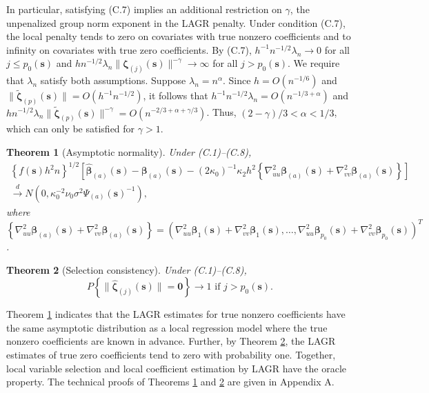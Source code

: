 \documentclass[authoryear,review, 12pt]{elsarticle}
\newtheorem{thm}{Theorem}
\begin{document}
In particular, satisfying (C.7) implies an additional restriction
on $\gamma$, the unpenalized group norm exponent in the LAGR penalty.
Under condition (C.7), the local penalty tends to zero on covariates
with true nonzero coefficients and to infinity on covariates with
true zero coefficients. By (C.7), $h^{-1}n^{-1/2}\lambda_{n}\to0$
for all $j\le p_{0}(\bm{s})$ and $hn^{-1/2}\lambda_{n}\|\bm{\zeta}_{(j)}(\bm{s})\|^{-\gamma}\to\infty$
for all $j>p_{0}(\bm{s})$. We require that $\lambda_{n}$ satisfy both assumptions.
Suppose $\lambda_{n}=n^{\alpha}$. Since $h=O\left(n^{-1/6}\right)$
and $\|\tilde{\bm{\zeta}}_{(p)}(\bm{s})\|=O\left(h^{-1}n^{-1/2}\right)$,
it follows that $h^{-1}n^{-1/2}\lambda_{n}=O\left(n^{-1/3+\alpha}\right)$
and $hn^{-1/2}\lambda_{n}\|\tilde{\bm{\zeta}}_{(p)}(\bm{s})\|^{-\gamma}=O\left(n^{-2/3+\alpha+\gamma/3}\right)$.
Thus, $\left(2-\gamma\right)/3<\alpha<1/3$, which can only be satisfied
for $\gamma>1$.
\begin{thm}[Asymptotic normality]
\label{theorem:normality}  Under (C.1)--(C.8),
\begin{gather*}
\left\{ f(\bm{s})h^{2}n\right\} ^{1/2}\left[\hat{\bm{\beta}}_{(a)}(\bm{s})-\bm{\beta}_{(a)}(\bm{s})-(2\kappa_{0})^{-1}\kappa_{2}h^{2}\left\{ \nabla_{uu}^{2}\bm{\beta}_{(a)}(\bm{s})+\nabla_{vv}^{2}\bm{\beta}_{(a)}(\bm{s})\right\} \right]\\
\xrightarrow{d}N\left(0,\kappa_{0}^{-2}\nu_{0}\sigma^{2}\Psi_{(a)}(\bm{s})^{-1}\right),
\end{gather*}
where $\left\{ \nabla_{uu}^{2}\bm{\beta}_{(a)}(\bm{s})+\nabla_{vv}^{2}\bm{\beta}_{(a)}(\bm{s})\right\} =\left(\nabla_{uu}^{2}\bm{\beta}_{1}(\bm{s})+\nabla_{vv}^{2}\bm{\beta}_{1}(\bm{s}),\dots,\nabla_{uu}^{2}\bm{\beta}_{p_{0}}(\bm{s})+\nabla_{vv}^{2}\bm{\beta}_{p_{0}}(\bm{s})\right)^{T}$.
\end{thm}

\begin{thm}[Selection consistency]
\label{theorem:selection} Under (C.1)--(C.8), 
\[
P\left\{ \|\hat{\bm{\zeta}}_{(j)}(\bm{s})\|=\bm{0}\right\} \to1\text{ if }j>p_{0}(\bm{s}).
\]
\end{thm}
Theorem \ref{theorem:normality} indicates that the LAGR estimates
for true nonzero coefficients have the same asymptotic distribution
as a local regression model where the true nonzero coefficients are
known in advance. Further, by Theorem \ref{theorem:selection}, the
LAGR estimates of true zero coefficients tend to zero with probability
one. Together, local variable selection and local coefficient estimation by LAGR
have the oracle property. The technical proofs of Theorems \ref{theorem:normality}
and \ref{theorem:selection} are given in Appendix A.
\end{document}
